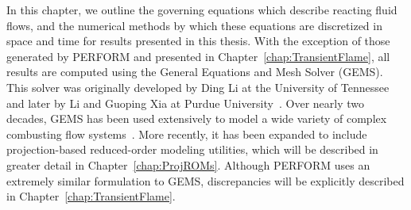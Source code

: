 
In this chapter, we outline the governing equations which describe reacting fluid flows, and the numerical methods by which these equations are discretized in space and time for results presented in this thesis. With the exception of those generated by PERFORM and presented in Chapter~\ref{chap:TransientFlame}, all results are computed using the General Equations and Mesh Solver (GEMS). This solver was originally developed by Ding Li at the University of Tennessee~\cite{Li2001} and later by Li and Guoping Xia at Purdue University~\cite{Li2006}. Over nearly two decades, GEMS has been used extensively to model a wide variety of complex combusting flow systems~\cite{Xia2011,Huang2014,Comer2016}. More recently, it has been expanded to include projection-based reduced-order modeling utilities, which will be described in greater detail in Chapter~\ref{chap:ProjROMs}. Although PERFORM uses an extremely similar formulation to GEMS, discrepancies will be explicitly described in Chapter~\ref{chap:TransientFlame}.